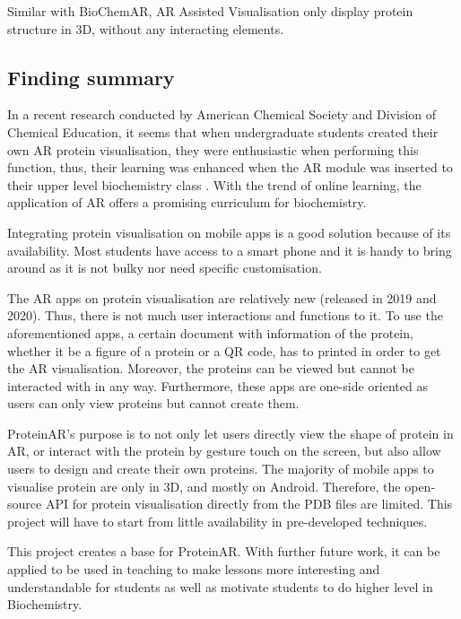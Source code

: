 Similar with BioChemAR, AR Assisted Visualisation only display protein structure in 3D, without any interacting elements. 

\subsection{Finding summary}
In a recent research conducted by American Chemical Society and Division of Chemical Education, it seems that when undergraduate students created their own AR protein visualisation, they were enthusiastic when performing this function, thus, their learning was enhanced when the AR module was inserted to their upper level biochemistry class \parencite{argu_fast_2020}. With the trend of online learning, the application of AR offers a promising curriculum for biochemistry.

Integrating protein visualisation on mobile apps is a good solution because of its availability. Most students have access to a smart phone and it is handy  to bring around as it is not bulky nor need specific customisation. 

The AR apps on protein visualisation are relatively new (released in 2019 and 2020). Thus, there is not much user interactions and functions to it. To use the aforementioned apps, a certain document with information of the protein, whether it be a figure of a protein or a QR code, has to printed in order to get the AR visualisation. Moreover, the proteins can be viewed but cannot be interacted with in any way. Furthermore, these apps are one-side oriented as users can only view proteins but cannot create them. 

ProteinAR’s purpose is to not only let users directly view the shape of protein in AR, or interact with the protein by gesture touch on the screen, but also allow users to design and create their own proteins.
The majority of mobile apps to visualise protein are only in 3D, and mostly on Android. Therefore, the open-source API for protein visualisation directly from the PDB files are limited. This project will have to start from little availability in pre-developed techniques.

This project creates a base for ProteinAR. With further future work, it can be applied to be used in teaching to make lessons more interesting and understandable for students as well as motivate students to do higher level in Biochemistry. 




